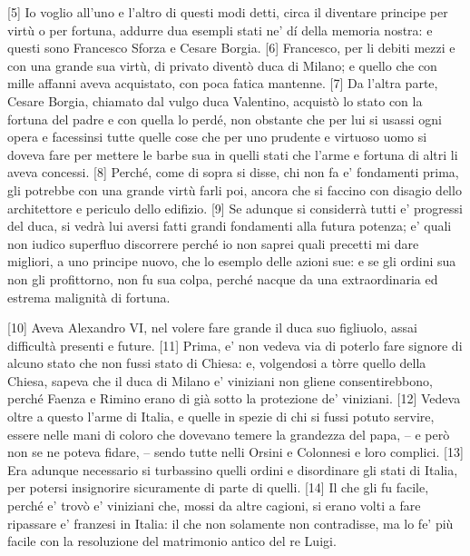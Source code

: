 {[}5{]} Io voglio all'uno e l'altro di questi modi detti, circa il
diventare principe per virtù o per fortuna, addurre dua esempli stati
ne' dí della memoria nostra: e questi sono Francesco Sforza e Cesare
Borgia. {[}6{]} Francesco, per li debiti mezzi e con una grande sua
virtù, di privato diventò duca di Milano; e quello che con mille affanni
aveva acquistato, con poca fatica mantenne. {[}7{]} Da l'altra parte,
Cesare Borgia, chiamato dal vulgo duca Valentino, acquistò lo stato con
la fortuna del padre e con quella lo perdé, non obstante che per lui si
usassi ogni opera e facessinsi tutte quelle cose che per uno prudente e
virtuoso uomo si doveva fare per mettere le barbe sua in quelli stati
che l'arme e fortuna di altri li aveva concessi. {[}8{]} Perché, come di
sopra si disse, chi non fa e' fondamenti prima, gli potrebbe con una
grande virtù farli poi, ancora che si faccino con disagio dello
architettore e periculo dello edifizio. {[}9{]} Se adunque si considerrà
tutti e' progressi del duca, si vedrà lui aversi fatti grandi fondamenti
alla futura potenza; e' quali non iudico superfluo discorrere perché io
non saprei quali precetti mi dare migliori, a uno principe nuovo, che lo
esemplo delle azioni sue: e se gli ordini sua non gli profittorno, non
fu sua colpa, perché nacque da una extraordinaria ed estrema malignità
di fortuna.

{[}10{]} Aveva Alexandro VI, nel volere fare grande il duca suo
figliuolo, assai difficultà presenti e future. {[}11{]} Prima, e' non
vedeva via di poterlo fare signore di alcuno stato che non fussi stato
di Chiesa: e, volgendosi a tòrre quello della Chiesa, sapeva che il duca
di Milano e' viniziani non gliene consentirebbono, perché Faenza e
Rimino erano di già sotto la protezione de' viniziani. {[}12{]} Vedeva
oltre a questo l'arme di Italia, e quelle in spezie di chi si fussi
potuto servire, essere nelle mani di coloro che dovevano temere la
grandezza del papa, -- e però non se ne poteva fidare, -- sendo tutte
nelli Orsini e Colonnesi e loro complici. {[}13{]} Era adunque
necessario si turbassino quelli ordini e disordinare gli stati di
Italia, per potersi insignorire sicuramente di parte di quelli. {[}14{]}
Il che gli fu facile, perché e' trovò e' viniziani che, mossi da altre
cagioni, si erano volti a fare ripassare e' franzesi in Italia: il che
non solamente non contradisse, ma lo fe' più facile con la resoluzione
del matrimonio antico del re Luigi.

